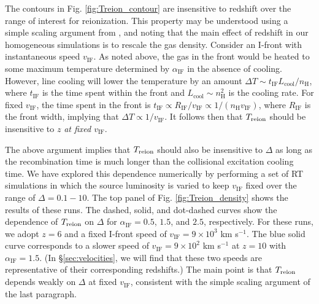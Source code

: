 \documentclass[twocolumn]{aastex62}
\newcommand{\Treion}{T_{\rm reion}}
\newcommand{\vIF}{v_{\mathrm{IF}}}
\newcommand{\spec}{\alpha_{\mathrm{IF}}}
\begin{document}
The contours in Fig. \ref{fig:Treion_contour} are insensitive to redshift over the range of interest for reionization.  This property may be understood using a simple scaling argument from \citet{2016MNRAS.457.3006D}, and noting that the main effect of redshift in our homogeneous simulations is to rescale the gas density.  Consider an I-front with instantaneous speed $\vIF$.  As noted above, the gas in the front would be heated to some maximum temperature determined by $\spec$ in the absence of cooling.  However, line cooling will lower the temperature by an amount $\Delta T \sim t_{\mathrm{IF}} L_{\mathrm{cool}}/n_{\mathrm{H}}$, where $t_{\mathrm{IF}}$ is the time spent within the front and $L_{\mathrm{cool}} \sim n_{\mathrm{H}}^2$ is the cooling rate.  For fixed $\vIF$, the time spent in the front is $t_{\mathrm{IF}}\propto R_{\mathrm{IF}}/\vIF \propto 1/(n_{\mathrm{H}} \vIF)$, where $R_{\mathrm{IF}}$ is the front width, implying that $\Delta T \propto 1/\vIF$.  It follows then that $\Treion$ should be insensitive to $z$ {\it at fixed $\vIF$}.

The above argument implies that $\Treion$ should also be insensitive to $\Delta$ as long as the recombination time is much longer than the collisional excitation cooling time.  We have explored this dependence numerically by performing a set of RT simulations in which the source luminosity is varied to keep $\vIF$ fixed over the range of $\Delta=0.1-10$.  The top panel of Fig. \ref{fig:Treion_density} shows the results of these runs.  The dashed, solid, and dot-dashed curves show the dependence of $\Treion$ on $\Delta$ for $\spec = 0.5$, $1.5$, and $2.5$, respectively.  For these runs, we adopt $z=6$ and a fixed I-front speed of $\vIF = 9 \times 10^3$ km s$^{-1}$.  The blue solid curve corresponds to a slower speed of $\vIF=9\times 10^{2}$ km s$^{-1}$ at $z=10$ with $\spec=1.5$. (In \S \ref{sec:velocities}, we will find that these two speeds are representative of their corresponding redshifts.)   The main point is that $\Treion$ depends weakly on $\Delta$ at fixed $\vIF$, consistent with the simple scaling argument of the last paragraph. 
\end{document}
